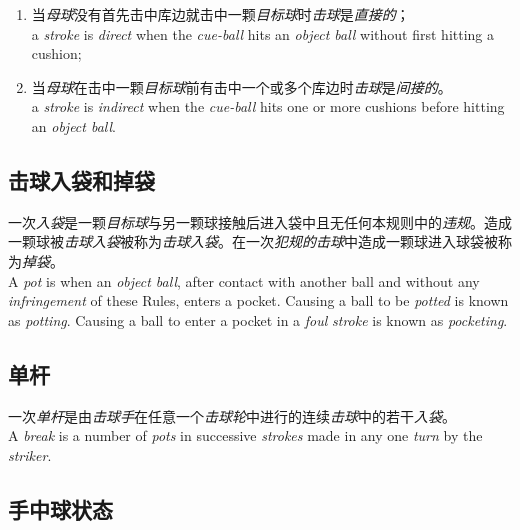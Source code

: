 \begin{enumerate}[label=(\alph*)]
    \begin{enumerate}[label=(\roman*)]
        \item 当\textit{母球}没有首先击中库边就击中一颗\textit{目标球}时\textit{击球}是\textit{直接的}；\\
        a \textit{stroke} is \textit{direct} when the \textit{cue-ball} hits an \textit{object ball} without first hitting a cushion;
        \item 当\textit{母球}在击中一颗\textit{目标球}前有击中一个或多个库边时\textit{击球}是\textit{间接的}。\\
        a \textit{stroke} is \textit{indirect} when the \textit{cue-ball} hits one or more cushions before hitting an \textit{object ball}.
    \end{enumerate}
\end{enumerate}

\subsection{击球入袋和掉袋}

\noindent 一次\textit{入袋}是一颗\textit{目标球}与另一颗球接触后进入袋中且无任何本规则中的\textit{违规}。造成一颗球被\textit{击球入袋}被称为\textit{击球入袋}。在一次\textit{犯规的}\textit{击球}中造成一颗球进入球袋被称为\textit{掉袋}。\\
A \textit{pot} is when an \textit{object ball}, after contact with another ball and without any \textit{infringement} of these Rules, enters a pocket. Causing a ball to be \textit{potted} is known as \textit{potting}. Causing a ball to enter a pocket in a \textit{foul} \textit{stroke} is known as \textit{pocketing}.

\subsection{单杆}

\noindent 一次\textit{单杆}是由\textit{击球手}在任意一个\textit{击球轮}中进行的连续\textit{击球}中的若干\textit{入袋}。\\
A \textit{break} is a number of \textit{pots} in successive \textit{strokes} made in any one \textit{turn} by the \textit{striker}.

\subsection{手中球状态}

